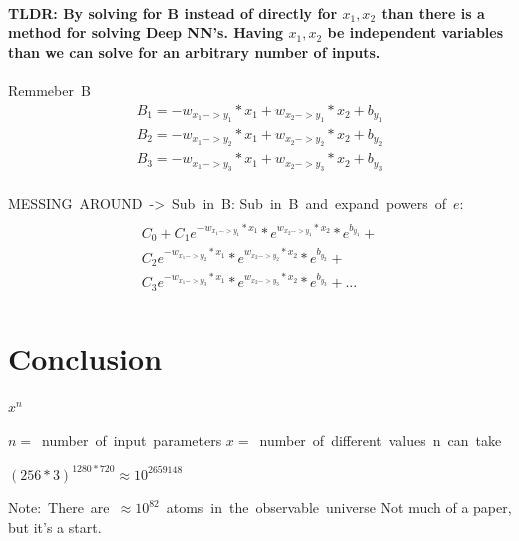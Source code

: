 \documentclass{article}
\begin{document}
\paragraph{TLDR: By solving for B instead of directly for $x_1, x_2$ than there is a method for solving Deep NN's. Having $x_1, x_2$ be independent
variables than we can solve for an arbitrary number of inputs.\newline} 

\hbox{Remmeber B}
\begin{multline}
    B_1 = -w_{x_1->y_1} * x_1 + w_{x_2->y_1} * x_2 + b_{y_1}\\
    B_2 = -w_{x_1->y_2} * x_1 + w_{x_2->y_2} * x_2 + b_{y_2}\\
    B_3 = -w_{x_1->y_3} * x_1 + w_{x_2->y_3} * x_2 + b_{y_3}\\
\end{multline}

\hbox{MESSING AROUND -> Sub in B:}
\hbox{Sub in B and expand powers of $e$:}
\begin{multline}\\
    C_0 + 
    C_1e^{-w_{x_1->y_1} * x_1}*e^{w_{x_2->y_1} * x_2}*e^{b_{y_1}} + \\
    C_2e^{-w_{x_1->y_2} * x_1}*e^{w_{x_2->y_2} * x_2}*e^{b_{y_2}} + \\
    C_3e^{-w_{x_1->y_3} * x_1}*e^{ w_{x_2->y_3} * x_2}*e^{b_{y_3}} + ... \\
\end{multline}




\section{Conclusion}

$x^n$

\hbox{$n =$ number of input parameters}
\hbox{$x =$ number of different values n can take}


$(256*3)^{1280*720} \approx 10^{2659148}$

\hbox{Note: There are $\approx 10^{82}$ atoms in the observable universe}
Not much of a paper, but it's a start.
\end{document}
